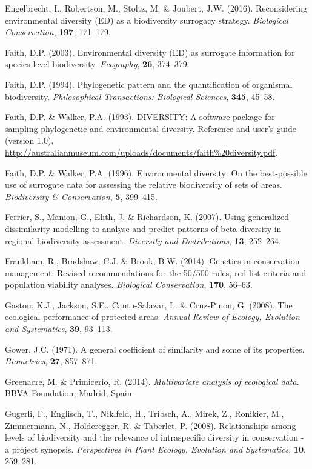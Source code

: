 \hypertarget{ref-r482}{}
Engelbrecht, I., Robertson, M., Stoltz, M. \& Joubert, J.W. (2016).
Reconsidering environmental diversity (ED) as a biodiversity surrogacy
strategy. \emph{Biological Conservation}, \textbf{197}, 171--179.

\hypertarget{ref-r203}{}
Faith, D.P. (2003). Environmental diversity (ED) as surrogate
information for species-level biodiversity. \emph{Ecography},
\textbf{26}, 374--379.

\hypertarget{ref-r481}{}
Faith, D.P. (1994). Phylogenetic pattern and the quantification of
organismal biodiversity. \emph{Philosophical Transactions: Biological
Sciences}, \textbf{345}, 45--58.

\hypertarget{ref-r480}{}
Faith, D.P. \& Walker, P.A. (1993). DIVERSITY: A software package for
sampling phylogenetic and environmental diversity. Reference and user's
guide (version 1.0),
\url{http://australianmuseum.com/uploads/documents/faith\%20diversity.pdf}.

\hypertarget{ref-r218}{}
Faith, D.P. \& Walker, P.A. (1996). Environmental diversity: On the
best-possible use of surrogate data for assessing the relative
biodiversity of sets of areas. \emph{Biodiversity \& Conservation},
\textbf{5}, 399--415.

\hypertarget{ref-r486}{}
Ferrier, S., Manion, G., Elith, J. \& Richardson, K. (2007). Using
generalized dissimilarity modelling to analyse and predict patterns of
beta diversity in regional biodiversity assessment. \emph{Diversity and
Distributions}, \textbf{13}, 252--264.

\hypertarget{ref-r487}{}
Frankham, R., Bradshaw, C.J. \& Brook, B.W. (2014). Genetics in
conservation management: Revised recommendations for the 50/500 rules,
red list criteria and population viability analyses. \emph{Biological
Conservation}, \textbf{170}, 56--63.

\hypertarget{ref-r465}{}
Gaston, K.J., Jackson, S.E., Cantu-Salazar, L. \& Cruz-Pinon, G. (2008).
The ecological performance of protected areas. \emph{Annual Review of
Ecology, Evolution and Systematics}, \textbf{39}, 93--113.

\hypertarget{ref-r459}{}
Gower, J.C. (1971). A general coefficient of similarity and some of its
properties. \emph{Biometrics}, \textbf{27}, 857--871.

\hypertarget{ref-r491}{}
Greenacre, M. \& Primicerio, R. (2014). \emph{Multivariate analysis of
ecological data}. BBVA Foundation, Madrid, Spain.

\hypertarget{ref-r463}{}
Gugerli, F., Englisch, T., Niklfeld, H., Tribsch, A., Mirek, Z.,
Ronikier, M., Zimmermann, N., Holderegger, R. \& Taberlet, P. (2008).
Relationships among levels of biodiversity and the relevance of
intraspecific diversity in conservation - a project synopsis.
\emph{Perspectives in Plant Ecology, Evolution and Systematics},
\textbf{10}, 259--281.

